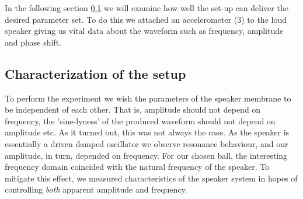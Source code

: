 \documentclass[12pt,oneside,a4paper]{article}
\numberwithin{equation}{section}
\begin{document}
{{{{In the following section \ref{Characterization} we will examine how well the 
set-up can deliver the desired parameter set. To do this we attached an 
accelerometer (3) to the loud speaker giving us vital data about the waveform 
such as frequency, amplitude and phase shift.
\subsection{Characterization of the setup}
\label{Characterization}
To perform the experiment we wish the parameters of the speaker membrane to be independent of each other. That is, amplitude should not depend on frequency, the 'sine-lyness' of the produced waveform should not depend on amplitude etc. As it turned out, this was not always the case. As the speaker is essentially a driven damped oscillator we observe resonance behaviour, and our amplitude, in turn, depended on frequency. For our chosen ball, the interesting frequency domain coincided with the natural frequency of the speaker. To mitigate this effect, we measured characteristics of the speaker system in hopes of controlling \emph{both} apparent amplitude and frequency.  

}}}}
\end{document}
